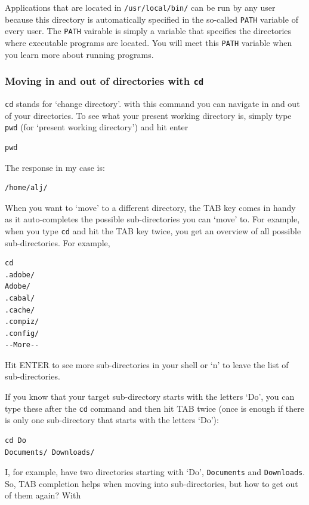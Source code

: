 \documentclass[11pt]{article}
\begin{document}
Applications that are located in \texttt{/usr/local/bin/} can be run by any
user because this directory is automatically specified in the so-called
\texttt{PATH} variable of every user. The \texttt{PATH} vairable is simply a
variable that specifies the directories where executable programs are
located. You will meet this \texttt{PATH} variable when you learn more about
running programs.
\subsubsection{Moving in and out of directories with \texttt{cd}}
\label{sec-2-1-2}

 \texttt{cd} stands for `change directory'. with this command you can navigate
 in and out of your directories. To see what your present working
 directory is, simply type \texttt{pwd} (for `present working directory') and
 hit enter


\begin{verbatim}
pwd
\end{verbatim}

 The response in my case is:


\begin{verbatim}
/home/alj/
\end{verbatim}

 When you want to `move' to a different directory, the TAB key comes in
 handy as it auto-completes the possible sub-directories you can `move'
 to. For example, when you type \texttt{cd} and hit the TAB key twice, you get an
 overview of all possible sub-directories. For example,


\begin{verbatim}
cd 
.adobe/
Adobe/
.cabal/
.cache/
.compiz/
.config/
--More--
\end{verbatim}

 Hit ENTER to see more sub-directories in your shell or `n' to leave the
 list of sub-directories.

 If you know that your target sub-directory starts with the letters
 `Do', you can type these after the \texttt{cd} command and then hit TAB twice
 (once is enough if there is only one sub-directory that starts with the
 letters `Do'):


\begin{verbatim}
cd Do
Documents/ Downloads/
\end{verbatim}

 I, for example, have two directories starting with `Do', \texttt{Documents}
 and \texttt{Downloads}. So, TAB completion helps when moving into
 sub-directories, but how to get out of them again? With
\end{document}

